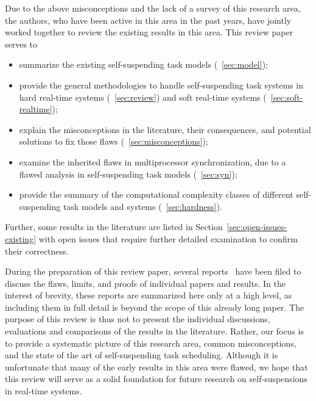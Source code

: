 \noindent Due to the above misconceptions and the lack of a survey of this research area, the authors, who have been active in this area in the past years, have jointly worked together to review the existing results in this area. This review paper serves to
\begin{itemize}
\item summarize the existing self-suspending task models (\mysectionref{}~\ref{sec:model}); 
\item provide the general methodologies to handle self-suspending task systems in hard real-time systems (\mysectionref{}~\ref{sec:review}) and soft real-time systems (\mysectionref{}~\ref{sec:soft-realtime});
\item explain the misconceptions in the literature, their consequences, and potential solutions to fix those flaws (\mysectionref{}~\ref{sec:misconceptions}); 
\item examine the inherited flaws in multiprocessor synchronization, due to a flawed analysis in self-suspending task models (\mysectionref{}~\ref{sec:syn});
\item provide the summary of the computational complexity classes of different self-suspending task models and systems (\mysectionref{}~\ref{sec:hardness}).
\end{itemize}
Further, some results in the literature are listed in Section~\ref{sec:open-issues-existing} with open issues that require further detailed examination to confirm their correctness. 

During the preparation of this review paper, several reports~ \cite{ChenHuangNelissen,ChenBrandenburg,erratu-cong-anderson,BletsasReport2015}  have been filed to discuss the flaws, limits, and proofs of individual papers and results. In the interest of brevity, these reports are summarized here only at a high level, as including them in full detail is beyond the scope of this already long paper.
The purpose of this review is thus not to present the individual discussions, evaluations and comparisons of the results in the literature. Rather, our focus is to provide a systematic picture of this research area, common misconceptions, and the state of the art of self-suspending task scheduling. Although it is unfortunate that many of the early results in this area were flawed, we hope that this review will serve as a solid foundation for future research on self-suspensions in real-time systems.









    
  

    
  
